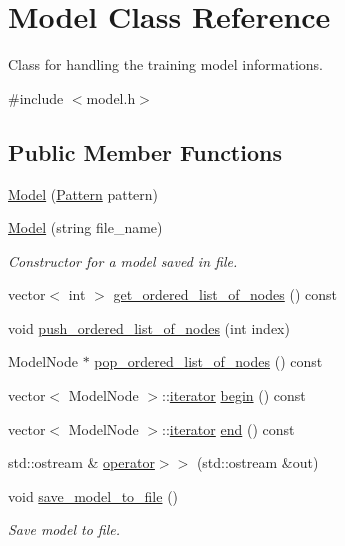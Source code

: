 \hypertarget{classModel}{\section{Model Class Reference}
\label{classModel}
}


Class for handling the training model informations.  




{\ttfamily \#include $<$model.\+h$>$}

\subsection*{Public Member Functions}
\begin{DoxyCompactItemize}
\item 
\hyperlink{classModel_a2970c96c9a3976c0887cb06f71753f1e}{Model} (\hyperlink{classPattern}{Pattern} pattern)
\item 
\hyperlink{classModel_a555e27949c7a209f607d77e5d57c1599}{Model} (string file\+\_\+name)
\begin{DoxyCompactList}\small\item\em Constructor for a model saved in file. \end{DoxyCompactList}\item 
vector$<$ int $>$ \hyperlink{classModel_ad821b67839a18f6fc6af508823ba73e0}{get\+\_\+ordered\+\_\+list\+\_\+of\+\_\+nodes} () const 
\item 
void \hyperlink{classModel_a6f2fa936b9d754d971f2972716b41656}{push\+\_\+ordered\+\_\+list\+\_\+of\+\_\+nodes} (int index)
\item 
Model\+Node $\ast$ \hyperlink{classModel_a7bae5e69e7ca1d5bb8a04c74148c82f0}{pop\+\_\+ordered\+\_\+list\+\_\+of\+\_\+nodes} () const 
\item 
vector$<$ Model\+Node $>$\+::\hyperlink{classModel_a0cfbe847990e80cb9033e8a3257bced2}{iterator} \hyperlink{classModel_a035c58a162aad06dad63a2be8976e17c}{begin} () const 
\item 
vector$<$ Model\+Node $>$\+::\hyperlink{classModel_a0cfbe847990e80cb9033e8a3257bced2}{iterator} \hyperlink{classModel_ad66f8045b3632a366af4f38b2042cf19}{end} () const 
\item 
std\+::ostream \& \hyperlink{classModel_a466e585afab385972eea3c8bd51f14f8}{operator$>$$>$} (std\+::ostream \&out)
\item 
void \hyperlink{classModel_afa9087f16c68b0c7cb67c5a285dde750}{save\+\_\+model\+\_\+to\+\_\+file} ()
\begin{DoxyCompactList}\small\item\em Save model to file. \end{DoxyCompactList}\end{DoxyCompactItemize}
